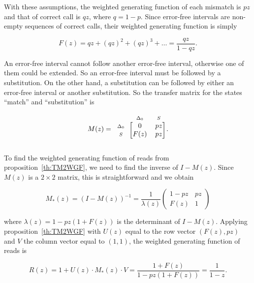 \documentclass{article}
\newcommand{\smS}{\scriptstyle{S}}
\newcommand{\smDELz}{\scriptstyle{\Delta_0}}
\begin{document}
With these assumptions, the weighted generating function of each mismatch
is $pz$ and that of correct call is $qz$, where $q=1-p$. Since error-free
intervals are non-empty sequences of correct calls, their weighted
generating function is simply

\begin{equation}
\label{eq:Fsub}
F(z) = qz + (qz)^2 + (qz)^3 + \ldots = \frac{qz}{1-qz}.
\end{equation}

An error-free interval cannot follow another error-free interval,
otherwise one of them could be extended. So an error-free interval must be
followed by a substitution. On the other hand, a substitution can be
followed by either an error-free interval or another substitution. So the
transfer matrix for the states ``match'' and ``substitution'' is

\begin{equation*}
M(z) = 
\begin{blockarray}{ccc}
       & \smDELz & \smS \\
\begin{block}{c[cc]}
\smDELz & 0    & pz \\
\smS    & F(z) & pz \\
\end{block}
\end{blockarray}.
\end{equation*}


To find the weighted generating function of reads from
proposition~\ref{th:TM2WGF}, we need to find the inverse of $I-M(z)$.
Since $M(z)$ is a $2 \times 2$ matrix, this is straightforward and we
obtain

\begin{equation*}
M_*(z) = (I-M(z))^{-1}=
\frac{1}{\lambda(z)}
\left(
\begin{matrix}
1-pz & pz   \\
F(z) & 1
\end{matrix}
\right)
\end{equation*}

\noindent
where $\lambda(z) = 1-pz(1+F(z))$ is the determinant of $I-M(z)$. Applying
proposition~\ref{th:TM2WGF} with $U(z)$ equal to the row vector $(F(z),
pz)$ and $V$ the column vector equal to $(1,1)$, the weighted generating
function of reads is

\begin{equation}
\label{eq:Rsub}
R(z) = 1 + U(z) \cdot M_*(z) \cdot V = 
\frac{1+F(z)}{1-pz(1+F(z))} = \frac{1}{1-z}.
\end{equation}
\end{document}
